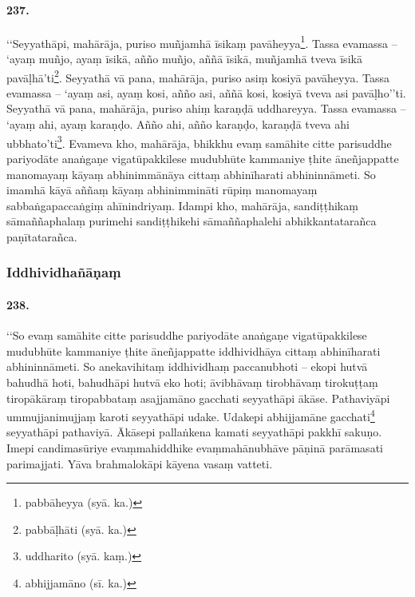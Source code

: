 \paragraph{237.} ‘‘Seyyathāpi, mahārāja, puriso muñjamhā īsikaṃ pavāheyya\footnote{pabbāheyya (syā. ka.)}. Tassa evamassa – ‘ayaṃ muñjo, ayaṃ īsikā, añño muñjo, aññā īsikā, muñjamhā tveva īsikā pavāḷhā’ti\footnote{pabbāḷhāti (syā. ka.)}. Seyyathā vā pana, mahārāja, puriso asiṃ kosiyā pavāheyya. Tassa evamassa – ‘ayaṃ asi, ayaṃ kosi, añño asi, aññā kosi, kosiyā tveva asi pavāḷho’’ti. Seyyathā vā pana, mahārāja, puriso ahiṃ karaṇḍā uddhareyya. Tassa evamassa – ‘ayaṃ ahi, ayaṃ karaṇḍo. Añño ahi, añño karaṇḍo, karaṇḍā tveva ahi ubbhato’ti\footnote{uddharito (syā. kaṃ.)}. Evameva kho, mahārāja, bhikkhu evaṃ samāhite citte parisuddhe pariyodāte anaṅgaṇe vigatūpakkilese mudubhūte kammaniye ṭhite āneñjappatte manomayaṃ kāyaṃ abhinimmānāya cittaṃ abhinīharati abhininnāmeti. So imamhā kāyā aññaṃ kāyaṃ abhinimmināti rūpiṃ manomayaṃ sabbaṅgapaccaṅgiṃ ahīnindriyaṃ. Idampi kho, mahārāja, sandiṭṭhikaṃ sāmaññaphalaṃ purimehi sandiṭṭhikehi sāmaññaphalehi abhikkantatarañca paṇītatarañca.

\subsubsection{Iddhividhañāṇaṃ}

\paragraph{238.} ‘‘So evaṃ samāhite citte parisuddhe pariyodāte anaṅgaṇe vigatūpakkilese mudubhūte kammaniye ṭhite āneñjappatte iddhividhāya cittaṃ abhinīharati abhininnāmeti. So anekavihitaṃ iddhividhaṃ paccanubhoti – ekopi hutvā bahudhā hoti, bahudhāpi hutvā eko hoti; āvibhāvaṃ tirobhāvaṃ tirokuṭṭaṃ tiropākāraṃ tiropabbataṃ asajjamāno gacchati seyyathāpi ākāse. Pathaviyāpi ummujjanimujjaṃ karoti seyyathāpi udake. Udakepi abhijjamāne gacchati\footnote{abhijjamāno (sī. ka.)} seyyathāpi pathaviyā. Ākāsepi pallaṅkena kamati seyyathāpi pakkhī sakuṇo. Imepi candimasūriye evaṃmahiddhike evaṃmahānubhāve pāṇinā parāmasati parimajjati. Yāva brahmalokāpi kāyena vasaṃ vatteti.


